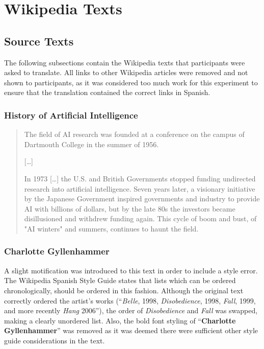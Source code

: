
\chapter{Wikipedia Texts}
\label{app:texts}



\section{Source Texts}

\noindent The following subsections contain the Wikipedia texts that participants were asked to translate. All links to other Wikipedia articles were removed and not shown to participants, as it was considered too much work for this experiment to ensure that the translation contained the correct links in Spanish.

\subsection{History of Artificial Intelligence}

\begin{quotation}
\noindent The field of AI research was founded at a conference on the campus of Dartmouth College in the summer of 1956. 

[\dots]

In 1973 [\dots] the U.S. and British Governments stopped funding undirected research into artificial intelligence. Seven years later, a visionary initiative by the Japanese Government inspired governments and industry to provide AI with billions of dollars, but by the late 80s the investors became disillusioned and withdrew funding again. This cycle of boom and bust, of "AI winters" and summers, continues to haunt the field.
\flushright\parencite{wikihistory}
\end{quotation}

\subsection{Charlotte Gyllenhammer}

\noindent A slight motification was introduced to this text in order to include a style error. The Wikipedia Spanish Style Guide \parencite{wikistyle} states that lists which can be ordered chronologically, should be ordered in this fashion. Although the original text correctly ordered the artist's works (``\textit{Belle}, 1998, \textit{Disobedience}, 1998, \textit{Fall}, 1999, and more recently \textit{Hang} 2006''), the order of \textit{Disobedience} and \textit{Fall} was swapped, making a clearly unordered list. Also, the bold font styling of ``\textbf{Charlotte Gyllenhammer}'' was removed as it was deemed there were sufficient other style guide considerations in the text.

